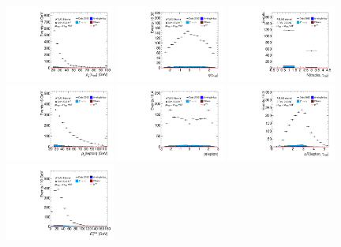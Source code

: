 \begin{figure}[tp]
  \centering
  \includegraphics[width=0.32\textwidth]{figures/antitaus/tau-pt}
  \includegraphics[width=0.32\textwidth]{figures/antitaus/tau-eta}
  \includegraphics[width=0.32\textwidth]{figures/antitaus/tau-numTrack}
  \includegraphics[width=0.32\textwidth]{figures/antitaus/lep-pt-hi}
  \includegraphics[width=0.32\textwidth]{figures/antitaus/lep-eta}
  \includegraphics[width=0.32\textwidth]{figures/antitaus/taulep-dR}
  \includegraphics[width=0.32\textwidth]{figures/antitaus/met-pt-hi}

\end{figure}
